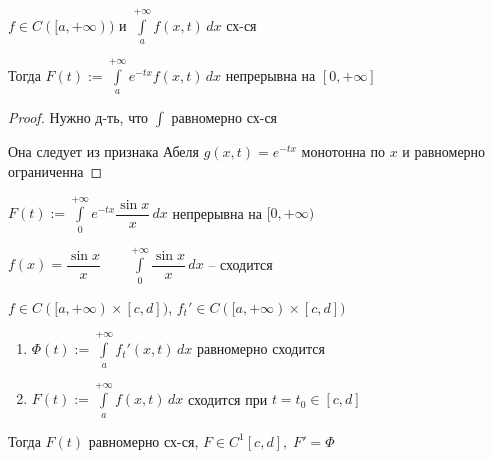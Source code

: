 
\begin{theorem}\thmslashn
	
	$f \in C([a, +\infty))$ и $ \int\limits_{a}^{+\infty} f(x, t)\,dx $ сх-ся
	
	Тогда $F(t) :=  \int\limits_{a}^{+\infty} e^{-tx}f(x, t)\,dx $ непрерывна на $[0, +\infty]$
	
\end{theorem}

\begin{proof}\thmslashn
	
	Нужно д-ть, что $\int$ равномерно сх-ся 
	
	Она следует из признака Абеля $g(x, t) = e^{-tx}$ монотонна по $x$ и равномерно ограниченна 

\end{proof}

\begin{example} \thmslashn
	
	$F(t) :=  \int\limits_{0}^{+\infty} e^{-tx} \dfrac{\sin x}{x}\,dx$ непрерывна на $[0, +\infty)$
	
	$f(x) = \dfrac{\sin x}{x} \qquad \int\limits_{0}^{+\infty} \dfrac{\sin x}{x}\,dx$ -- сходится
		
\end{example}

\begin{theorem}\thmslashn
	
	$f \in C([a, +\infty) \times [c, d])$, $f_t' \in C([a, +\infty) \times [c, d])$
	\begin{enumerate}
		\item 
		$\Phi(t) := \int\limits_{a}^{+\infty} f_t'(x, t)\,dx$ равномерно сходится
		\item 
		$F(t) := \int\limits_{a}^{+\infty} f(x, t)\,dx$ сходится при $t = t_0 \in [c, d]$
	\end{enumerate}
	 	
	Тогда $F(t)$ равномерно сх-ся, $F \in C^1[c, d],\; F' = \Phi$
	
\end{theorem}

